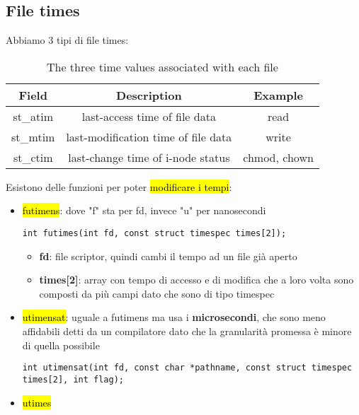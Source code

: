 \subsection{File times}

Abbiamo 3 tipi di file times:

\begin{table}[!h]
    \centering
    \begin{tabular}{|c|c|c|}
        \hline
        \textbf{Field} & \textbf{Description} & \textbf{Example} \\\hline\hline
        st\_atim & last-access time of file data & read \\\hline
        st\_mtim & last-modification time of file data & write \\\hline
        st\_ctim & last-change time of i-node status & chmod, chown \\\hline
    \end{tabular}
    \caption{\label{tab:widgets}The three time values associated with each file}
\end{table}


Esistono delle funzioni per poter \hl{modificare i tempi}:

\begin{itemize}
	\item \hl{futimens}: dove "f" sta per fd, invece "u" per nanosecondi

\begin{lstlisting}
int futimes(int fd, const struct timespec times[2]);
\end{lstlisting}

\begin{itemize}
	\item \textbf{fd}: file scriptor, quindi cambi il tempo ad un file già aperto
	\item \textbf{times[2]}: array con tempo di accesso e di modifica che a loro volta sono composti da più campi dato che sono di tipo timespec
\end{itemize}

	\item \hl{utimensat}: uguale a futimens ma usa i \textbf{microsecondi}, che sono meno affidabili detti da un compilatore dato che la granularità promessa è minore di quella possibile
	
\begin{lstlisting}
int utimensat(int fd, const char *pathname, const struct timespec times[2], int flag);
\end{lstlisting}

	\item \hl{utimes}
\end{itemize}

